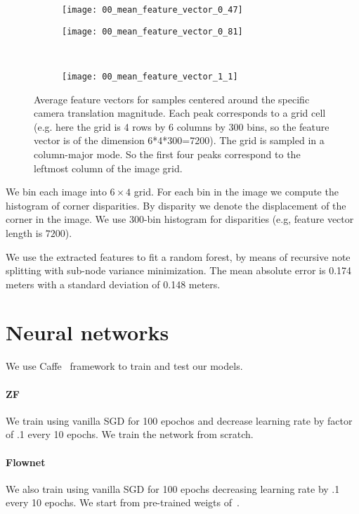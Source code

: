 \begin{figure}[!ht]
  \centering
  \begin{subfigure}{.45\linewidth}
    \centering
    \texttt{[image: 00\_mean\_feature\_vector\_0\_47]}
    \caption{}\label{fig:1a}
  \end{subfigure}%
  \begin{subfigure}{.45\linewidth}
    \centering
    \texttt{[image: 00\_mean\_feature\_vector\_0\_81]}
    \caption{}\label{fig:1b}
  \end{subfigure}%
  \\
  \begin{subfigure}{\linewidth}
    \centering
    \texttt{[image: 00\_mean\_feature\_vector\_1\_1]}
    \caption{}\label{fig:1c}
  \end{subfigure}%
  \caption{Average feature vectors for samples centered around the
    specific camera translation magnitude.  Each peak corresponds to a
    grid cell (e.g. here the grid is 4 rows by 6 columns by 300 bins,
    so the feature vector is of the dimension 6*4*300=7200).  The grid
    is sampled in a column-major mode. So the first four peaks
    correspond to the leftmost column of the image grid.}
  \label{fig:feature_vectors}
\end{figure}

We bin each image into $6\times 4$ grid.  For each bin in the image we
compute the histogram of corner disparities.  By disparity we denote
the displacement of the corner in the image.  We use $300$-bin
histogram for disparities (e.g, feature vector length is $7200$).

We use the extracted features to fit a random forest, by means of
recursive note splitting with sub-node variance minimization. The mean
absolute error is 0.174 meters with a standard deviation of 0.148
meters.

\section{Neural networks}

We use Caffe~\cite{jia2014caffe} framework to train and test our
models.
\paragraph{ZF} We train using vanilla SGD for 100 epochos and decrease
learning rate by factor of .1 every 10 epochs. We train the network
from scratch.
\paragraph{Flownet} We also train using vanilla SGD for 100 epochs
decreasing learning rate by .1 every 10 epochs.  We start from
pre-trained weigts of~\cite{fischer2015flownet}.
